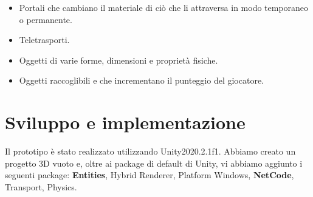 \begin{itemize}
    \item Portali che cambiano il materiale di ciò che li attraversa in modo temporaneo o permanente.
    \item Teletrasporti.
    \item Oggetti di varie forme, dimensioni e proprietà fisiche.
    \item Oggetti raccoglibili e che incrementano il punteggio del giocatore.
\end{itemize}

\section{Sviluppo e implementazione}

Il prototipo è stato realizzato utilizzando Unity2020.2.1f1. Abbiamo creato un progetto 3D vuoto e, oltre ai package di default di Unity, vi abbiamo aggiunto i seguenti package: \textbf{Entities}, Hybrid Renderer, Platform Windows, \textbf{NetCode}, Transport, Physics.

